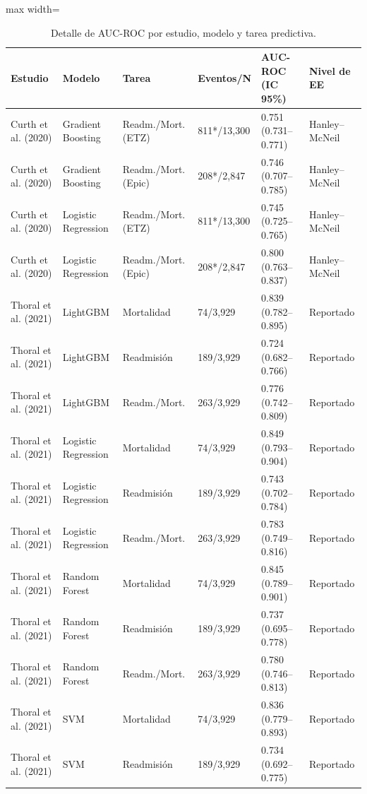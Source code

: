 \begin{table}[H]
\centering
\caption{Detalle de AUC-ROC por estudio, modelo y tarea predictiva.}\label{tab:detalle_auc}
\scriptsize
\begin{adjustbox}{max width=\textwidth}
\begin{tabular}{llllll}
\toprule
\textbf{Estudio} & \textbf{Modelo} & \textbf{Tarea} & \textbf{Eventos/N} & \textbf{AUC-ROC (IC 95\%)} & \textbf{Nivel de EE} \\
\midrule
    Curth et al. (2020) & Gradient Boosting & Readm./Mort. (ETZ) & 811*/13,300 & 0.751 (0.731--0.771) & Hanley--McNeil \\
    Curth et al. (2020) & Gradient Boosting & Readm./Mort. (Epic) & 208*/2,847 & 0.746 (0.707--0.785) & Hanley--McNeil \\
    Curth et al. (2020) & Logistic Regression & Readm./Mort. (ETZ) & 811*/13,300 & 0.745 (0.725--0.765) & Hanley--McNeil \\
    Curth et al. (2020) & Logistic Regression & Readm./Mort. (Epic) & 208*/2,847 & 0.800 (0.763--0.837) & Hanley--McNeil \\
    Thoral et al. (2021) & LightGBM & Mortalidad & 74/3,929 & 0.839 (0.782--0.895) & Reportado \\
    Thoral et al. (2021) & LightGBM & Readmisión & 189/3,929 & 0.724 (0.682--0.766) & Reportado \\
    Thoral et al. (2021) & LightGBM & Readm./Mort. & 263/3,929 & 0.776 (0.742--0.809) & Reportado \\
    Thoral et al. (2021) & Logistic Regression & Mortalidad & 74/3,929 & 0.849 (0.793--0.904) & Reportado \\
    Thoral et al. (2021) & Logistic Regression & Readmisión & 189/3,929 & 0.743 (0.702--0.784) & Reportado \\
    Thoral et al. (2021) & Logistic Regression & Readm./Mort. & 263/3,929 & 0.783 (0.749--0.816) & Reportado \\
    Thoral et al. (2021) & Random Forest & Mortalidad & 74/3,929 & 0.845 (0.789--0.901) & Reportado \\
    Thoral et al. (2021) & Random Forest & Readmisión & 189/3,929 & 0.737 (0.695--0.778) & Reportado \\
    Thoral et al. (2021) & Random Forest & Readm./Mort. & 263/3,929 & 0.780 (0.746--0.813) & Reportado \\
    Thoral et al. (2021) & SVM & Mortalidad & 74/3,929 & 0.836 (0.779--0.893) & Reportado \\
    Thoral et al. (2021) & SVM & Readmisión & 189/3,929 & 0.734 (0.692--0.775) & Reportado \\

\end{tabular}
\end{adjustbox}
\end{table}
